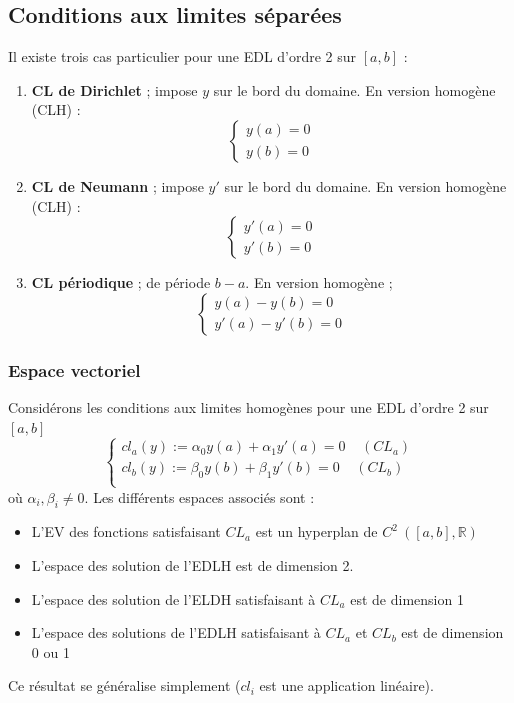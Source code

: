 \documentclass	[11pt, a4paper, openany]{book}
\begin{document}
\subsection{Conditions aux limites séparées}
Il existe trois cas particulier pour une EDL d'ordre 2 sur $[a,b]$ :
\begin{enumerate}
\item \textbf{CL de Dirichlet} ; impose $y$ sur le bord du domaine. En version homogène (CLH) :
\begin{equation}
\left\{\begin{array}{l}
y(a) = 0\\
y(b) = 0
\end{array}\right.
\end{equation}
\item \textbf{CL de Neumann} ; impose $y'$ sur le bord du domaine. En version homogène (CLH) :
\begin{equation}
\left\{\begin{array}{l}
y'(a) = 0\\
y'(b) = 0
\end{array}\right.
\end{equation}
\item \textbf{CL périodique} ; de période $b-a$. En version homogène ;
\begin{equation}
\left\{\begin{array}{l}
y(a)-y(b) = 0\\
y'(a) - y'(b) = 0
\end{array}\right.
\end{equation}
\end{enumerate}
\subsubsection{Espace vectoriel}
Considérons les conditions aux limites homogènes pour une EDL d'ordre 2 sur $[a,b]$
\begin{equation}
\left\{\begin{array}{l}
cl_a(y) := \alpha_0y(a) + \alpha_1y'(a) = 0\ \ \ \ \ (CL_a)\\
cl_b(y) := \beta_0y(b) + \beta_1y'(b) = 0\ \ \ \ \ (CL_b)\\
\end{array}\right.
\end{equation}
où $\alpha_i,\beta_i \neq 0$. Les différents espaces associés sont :
\begin{itemize}
\item L'EV des fonctions satisfaisant $CL_a$ est un hyperplan de $C^2\ ([a,b], \mathbb{R})$
\item L'espace des solution de l'EDLH est de dimension 2.
\item L'espace des solution de l'ELDH satisfaisant à $CL_a$ est de dimension 1
\item L'espace des solutions de l'EDLH satisfaisant à $CL_a$ et $CL_b$ est de dimension 0 ou 1
\end{itemize}
Ce résultat se généralise simplement ($cl_i$ est une application linéaire).
\end{document}
